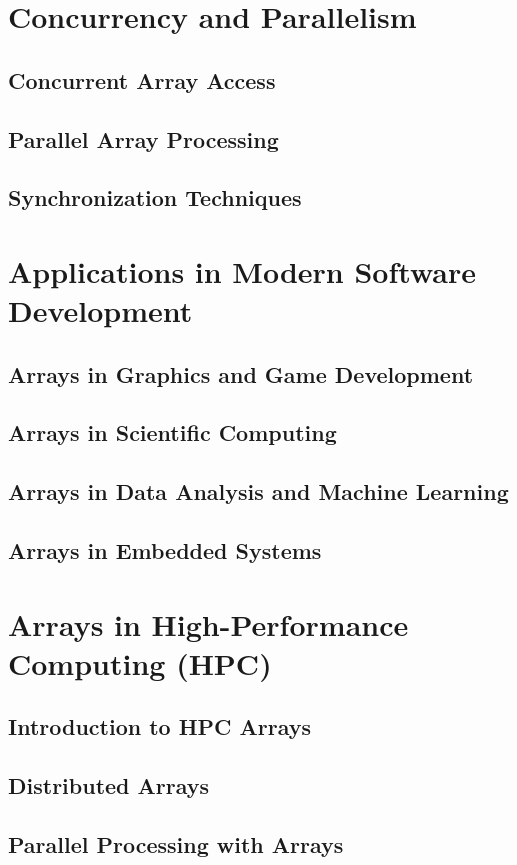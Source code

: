 \documentclass[12pt, oneside]{book}
\begin{document}
\chapter{Concurrency and Parallelism}
\section{Concurrent Array Access}
\section{Parallel Array Processing}
\section{Synchronization Techniques}

\chapter{Applications in Modern Software Development}
\section{Arrays in Graphics and Game Development}
\section{Arrays in Scientific Computing}
\section{Arrays in Data Analysis and Machine Learning}
\section{Arrays in Embedded Systems}

\chapter{Arrays in High-Performance Computing (HPC)}
\section{Introduction to HPC Arrays}
\section{Distributed Arrays}
\section{Parallel Processing with Arrays}
\end{document}
